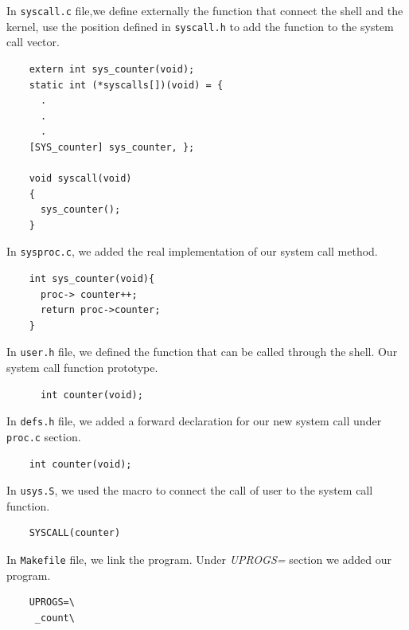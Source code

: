 \documentclass[10pt]{scrartcl}
\begin{document}
In \texttt{syscall.c} file,we define externally the function that connect the shell and the kernel, use the position defined in \texttt{syscall.h} to add the function to the system call vector.
 \begin{verbatim}
    extern int sys_counter(void);
    static int (*syscalls[])(void) = {
      .
      .
      .
    [SYS_counter] sys_counter, };
    
    void syscall(void)
    {
      sys_counter();
    }
\end{verbatim}

In \texttt{sysproc.c}, we added the real implementation of our system call method.
 \begin{verbatim}
    int sys_counter(void){
      proc-> counter++;
      return proc->counter;
    }
\end{verbatim}

In \texttt{user.h} file, we defined the function that can be called through the shell.  Our system call function prototype.
 \begin{verbatim}
      int counter(void);
\end{verbatim}

In \texttt{defs.h} file, we added a forward declaration for our new system call under \texttt{proc.c} section.
 \begin{verbatim}
    int counter(void);
\end{verbatim}

In \texttt{usys.S}, we used the macro to connect the call of user to the system call function.
 \begin{verbatim}
    SYSCALL(counter)
\end{verbatim}

In \texttt{Makefile} file, we link the program. Under \textit{UPROGS=} section we added our program.
 \begin{verbatim}
    UPROGS=\
     _count\
\end{verbatim}
\end{document}
